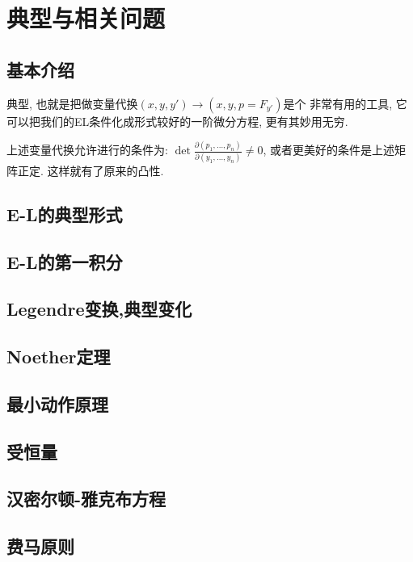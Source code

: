 \section{典型与相关问题}

\subsection{基本介绍}

    典型, 也就是把做变量代换\((x,y,y') \to (x,y,p = F_{y'})\)是个
    非常有用的工具, 它可以把我们的EL条件化成形式较好的一阶微分方程,
    更有其妙用无穷.

    上述变量代换允许进行的条件为:
    \(\det\frac{\partial(p_1,\dots,p_n)}{\partial(y_1,\dots,y_n)} \ne 0\),
    或者更美好的条件是上述矩阵正定. 这样就有了原来的凸性. 


\subsection{E-L的典型形式}
\subsection{E-L的第一积分}
\subsection{Legendre变换,典型变化}
\subsection{Noether定理}
\subsection{最小动作原理}
\subsection{受恒量}
\subsection{汉密尔顿-雅克布方程}
\subsection{费马原则}
